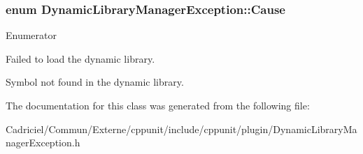 \subsubsection[{\texorpdfstring{Cause}{Cause}}]{\setlength{\rightskip}{0pt plus 5cm}enum {\bf Dynamic\+Library\+Manager\+Exception\+::\+Cause}}\hypertarget{class_dynamic_library_manager_exception_a73b4694c152e0693fbc19fb04987a0b9}{}\label{class_dynamic_library_manager_exception_a73b4694c152e0693fbc19fb04987a0b9}
\begin{Desc}
\item[Enumerator]\par
\begin{description}
\item[{\em 
loading\+Failed\hypertarget{class_dynamic_library_manager_exception_a73b4694c152e0693fbc19fb04987a0b9a778b42fb996bf018bdc26934649cad63}{}\label{class_dynamic_library_manager_exception_a73b4694c152e0693fbc19fb04987a0b9a778b42fb996bf018bdc26934649cad63}
}]Failed to load the dynamic library. \item[{\em 
symbol\+Not\+Found\hypertarget{class_dynamic_library_manager_exception_a73b4694c152e0693fbc19fb04987a0b9a193fc58bb852e09790da269e2b613045}{}\label{class_dynamic_library_manager_exception_a73b4694c152e0693fbc19fb04987a0b9a193fc58bb852e09790da269e2b613045}
}]Symbol not found in the dynamic library. \end{description}
\end{Desc}


The documentation for this class was generated from the following file\+:\begin{DoxyCompactItemize}
\item 
Cadriciel/\+Commun/\+Externe/cppunit/include/cppunit/plugin/Dynamic\+Library\+Manager\+Exception.\+h\end{DoxyCompactItemize}
